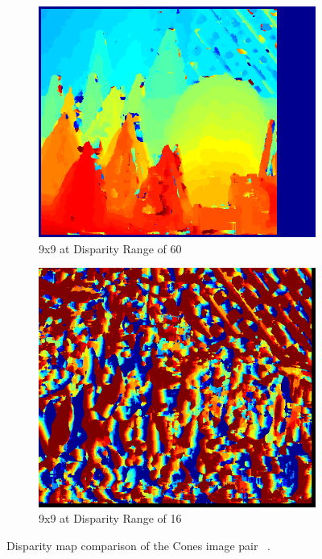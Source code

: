 \begin{figure}
\begin{center}
\begin{subfigure}{0.45\textwidth}
	\end{subfigure}
	\\
	\begin{subfigure}{0.45\textwidth}
		\includegraphics[width=\textwidth]{figures/cones_9x9_matlab_0-59.png}
		\caption{9x9 at Disparity Range of 60 ~\cite{matlab}}
		\label{fig:conesMatlab}
	\end{subfigure}
	\begin{subfigure}{0.45\textwidth}
		\includegraphics[width=\textwidth]{figures/cones_9x9_python3.png}
		\caption{9x9 at Disparity Range of 16}
		\label{fig:conesPy}
	\end{subfigure}
	\captionfonts
	\caption{Disparity map comparison of the Cones image pair ~\cite{middlebury}.}
	\label{fig:conesDispMap}
\end{center}
\end{figure}




